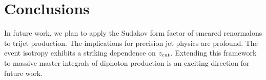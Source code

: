 \section{Conclusions}\label{sec:conclusions}

In future work, we plan to apply the Sudakov form factor of smeared
renormalons to trijet production. The implications for precision jet
physics are profound. The event isotropy exhibits a striking dependence
on $z_{\rm cut}$. Extending this framework to massive master integrals
of diphoton production is an exciting direction for future work.

